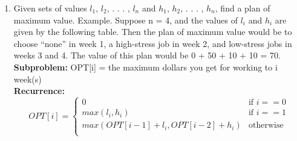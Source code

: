 \documentclass[]{article}
\begin{document}
\begin{enumerate}
    \item Given sets of values $l_1$, $l_2$, . . . , $l_n$ and $h_1$, $h_2$, . . . , $h_n$, find a plan of maximum value. Example. Suppose n = 4, and the values of $l_i$ and $h_i$ are given by the following table. Then the plan of maximum value would be to choose “none” in week 1, a high-stress job in week 2, and low-stress jobs in weeks 3 and 4. The value of this plan would be 0 + 50 + 10 + 10 = 70.\\
\textbf{Subproblem:} OPT[i] = the maximum dollars you get for working to i week(s)\\
\textbf{Recurrence:} 
\begin{equation}
    OPT[i] = 
    \begin{cases}
    0 & \text{if } i == 0\\
    max(l_i, h_i) & \text{if } i == 1\\
    max(OPT[i-1] + l_i, OPT[i-2] + h_i) & \text{otherwise}\\
    \end{cases}
\end{equation}


\end{enumerate}
\end{document}
